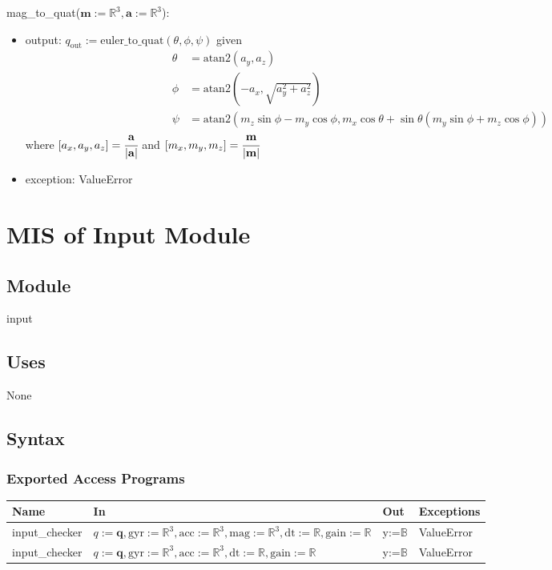 \documentclass[12pt, titlepage]{article}
\begin{document}
\noindent mag\_to\_quat($\mathbf{m}:=\mathbb{R}^3, \mathbf{a}:=\mathbb{R}^3$):
\begin{itemize}
\item output: $q_\text{out}:= \text{euler\_to\_quat}(\theta, \phi, \psi)$ given
\begin{align*}
  \theta &= \text{atan2}(a_y, a_z) \\
  \phi &= \text{atan2}(-a_x, \sqrt{a_y^2+a_z^2}) \\
  \psi &= \text{atan2}(m_z\sin\phi - m_y\cos\phi, m_x\cos\theta + \sin\theta(m_y\sin\phi + m_z\cos\phi))
\end{align*}
where $[a_x, a_y, a_z] = \cfrac{\mathbf{a}}{|\mathbf{a}|}$ and $[m_x, m_y, m_z] = \cfrac{\mathbf{m}}{|\mathbf{m}|}$
\item exception: ValueError
\end{itemize}

\newpage

\section{MIS of Input Module} \label{ivm}

\subsection{Module}
input

\subsection{Uses}
None

\subsection{Syntax}

\subsubsection{Exported Access Programs}

\begin{center}
\begin{tabular}{p{3cm} p{8cm} p{1cm} p{2cm}}
\hline
\textbf{Name} & \textbf{In} & \textbf{Out} & \textbf{Exceptions} \\
\hline
input\_checker & $q:=\mathbf{q}, \text{gyr}:=\mathbb{R}^3, \text{acc}:=\mathbb{R}^3, \text{mag}:=\mathbb{R}^3, \text{dt}:=\mathbb{R}, \text{gain}:= \mathbb{R}$ & y:=$\mathbb{B}$ & ValueError \\
input\_checker & $q:=\mathbf{q}, \text{gyr}:=\mathbb{R}^3, \text{acc}:=\mathbb{R}^3, \text{dt}:=\mathbb{R}, \text{gain}:= \mathbb{R}$ & y:=$\mathbb{B}$ & ValueError \\
\hline
\end{tabular}
\end{center}
\end{document}
